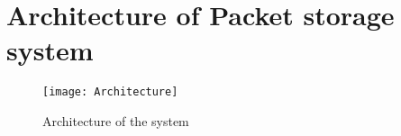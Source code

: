 \section*{Architecture of Packet storage system}

\begin{figure}[h]
\center
\texttt{[image: Architecture]}
\caption{Architecture of the system}
\label{fig:architecture}
\end{figure}